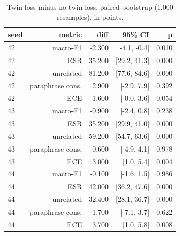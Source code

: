 \begin{table}[t]
\centering
\caption{Twin loss minus no twin loss, paired bootstrap (1,000 resamples), in points.}
\label{tab:tab_bootstrap}
\begin{tabular}{lrrrr}
\toprule
seed & metric & diff & 95\% CI & p \\
\midrule
42 & macro-F1 & -2.300 & [-4.1, -0.4] & 0.010 \\
42 & ESR & 35.200 & [29.2, 41.3] & 0.000 \\
42 & unrelated & 81.200 & [77.6, 84.6] & 0.000 \\
42 & paraphrase cons. & 2.900 & [-2.9, 7.9] & 0.392 \\
42 & ECE & 1.600 & [-0.0, 3.6] & 0.054 \\
43 & macro-F1 & -0.900 & [-2.4, 0.8] & 0.238 \\
43 & ESR & 35.200 & [29.9, 41.0] & 0.000 \\
43 & unrelated & 59.200 & [54.7, 63.6] & 0.000 \\
43 & paraphrase cons. & -0.600 & [-4.9, 4.1] & 0.978 \\
43 & ECE & 3.000 & [1.0, 5.4] & 0.004 \\
44 & macro-F1 & -0.100 & [-1.6, 1.5] & 0.986 \\
44 & ESR & 42.000 & [36.2, 47.6] & 0.000 \\
44 & unrelated & 32.400 & [28.1, 36.7] & 0.000 \\
44 & paraphrase cons. & -1.700 & [-7.1, 3.7] & 0.622 \\
44 & ECE & 3.700 & [1.0, 5.8] & 0.008 \\
\bottomrule
\end{tabular}
\end{table}
